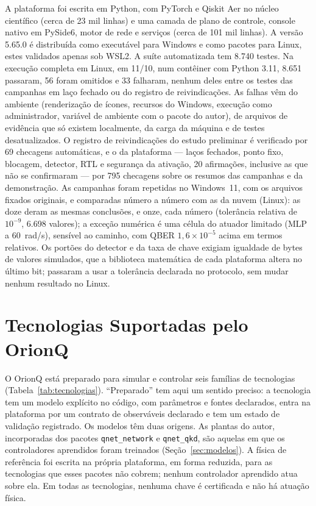 \documentclass[12pt]{article}
\begin{document}
A plataforma foi escrita em Python, com PyTorch \cite{paszke2019} e Qiskit Aer
\cite{javadi2024} no núcleo científico (cerca de 23 mil linhas) e uma camada de
plano de controle, console nativo em PySide6, motor de rede e serviços (cerca de
101 mil linhas). A versão 5.65.0 é distribuída como executável para Windows e
como pacotes para Linux, estes validados apenas sob WSL2. A suíte automatizada
tem 8.740 testes. Na execução completa em Linux, em 11/10, num contêiner com
Python 3.11, 8.651 passaram, 56 foram omitidos e 33 falharam, nenhum deles entre
os testes das campanhas em laço fechado ou do registro de reivindicações. As
falhas vêm do ambiente (renderização de ícones, recursos do Windows, execução
como administrador, variável de ambiente com o pacote do
autor), de arquivos de
evidência que só existem localmente, da carga da máquina e de testes
desatualizados. O registro de
reivindicações do estudo preliminar é verificado por 69 checagens automáticas, e o
da plataforma --- laços fechados, ponto fixo, blocagem, detector, RTL e segurança da ativação,
20 afirmações, inclusive as que não se confirmaram --- por 795 checagens sobre os
resumos das campanhas e da demonstração. As campanhas foram repetidas no Windows~11,
com os arquivos fixados originais, e comparadas número a número com as da nuvem
(Linux): as doze deram as mesmas conclusões, e onze, cada número (tolerância
relativa de $10^{-9}$, 6.698 valores); a exceção numérica é uma célula do atuador
limitado (MLP a 60~rad/s), sensível ao caminho, com QBER $1{,}6\times10^{-5}$ acima em
termos relativos. Os portões do detector e da taxa de chave exigiam igualdade de bytes
de valores simulados, que a biblioteca matemática de cada plataforma altera no último
bit; passaram a usar a tolerância declarada no protocolo, sem mudar nenhum resultado no
Linux.

\section{Tecnologias Suportadas pelo OrionQ}
\label{sec:tecnologias}

O OrionQ está preparado para simular e controlar seis famílias de tecnologias
(Tabela~\ref{tab:tecnologias}). ``Preparado'' tem aqui um sentido preciso: a
tecnologia tem um modelo explícito no código, com parâmetros e fontes declarados,
entra na plataforma por um contrato de observáveis declarado e tem um estado de
validação registrado. Os modelos têm duas origens. As plantas do autor, incorporadas
dos pacotes \texttt{qnet\_network} e \texttt{qnet\_qkd}, são aquelas em que os
controladores aprendidos foram treinados (Seção~\ref{sec:modelos}). A física de
referência foi escrita na própria plataforma, em forma reduzida, para as
tecnologias que esses pacotes não cobrem; nenhum controlador aprendido atua sobre
ela. Em todas as tecnologias, nenhuma chave é certificada e não há atuação
física.
\end{document}
